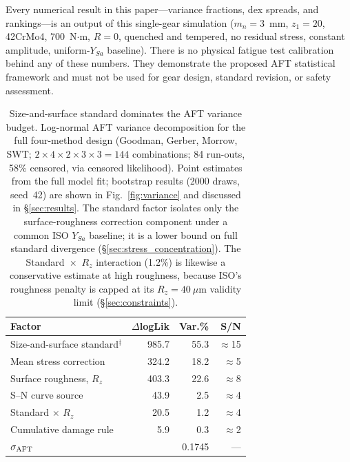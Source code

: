 \documentclass[twocolumn,12pt,a4paper]{article}
\begin{document}
\begin{warningbox}
Every numerical result in this paper---variance fractions, dex spreads,
and rankings---is an output of this single-gear simulation ($m_n=3$~mm,
$z_1=20$, 42CrMo4, 700~N$\cdot$m, $R=0$, quenched and tempered, no
residual stress, constant amplitude, uniform-$Y_{Sa}$ baseline). There
is no physical fatigue test calibration behind any of these numbers.
They demonstrate the proposed AFT statistical framework and must not be
used for gear design, standard revision, or safety assessment.
\end{warningbox}

\begin{table}[h]
\centering
\caption{Size-and-surface standard dominates the AFT variance budget.
Log-normal AFT variance decomposition for the full four-method design
(Goodman, Gerber, Morrow, SWT;
$2\times4\times2\times3\times3 = 144$ combinations; 84 run-outs,
58\% censored, via censored likelihood). Point estimates from the
full model fit; bootstrap results (2000 draws, seed~42) are shown
in Fig.~\ref{fig:variance} and discussed in \S\ref{sec:results}.
The standard factor isolates only the surface-roughness correction
component under a common ISO $Y_{Sa}$ baseline; it is a lower bound
on full standard divergence (\S\ref{sec:stress_concentration}). The
Standard~$\times$~$R_z$ interaction (1.2\%) is likewise a conservative
estimate at high roughness, because ISO's roughness penalty is capped
at its $R_z=40~\mu$m validity limit
(\S\ref{sec:constraints}).}
\label{tab:anova}
\footnotesize
\begin{tabular}{lrrr}
\toprule
Factor & $\Delta$logLik & Var.\% & S/N \\
\midrule
Size-and-surface standard$^\ddagger$ & 985.7 & 55.3 & $\approx$15 \\ %
Mean stress correction & 324.2 & 18.2 & $\approx$5 \\ %
Surface roughness, $R_z$    & 403.3 & 22.6 & $\approx$8 \\ %
S--N curve source      & 43.9 &  2.5 &  $\approx$4 \\ %
Standard $\times$ $R_z$     & 20.5 &  1.2 &  $\approx$4 \\ %
Cumulative damage rule &  5.9 &  0.3 &  $\approx$2 \\ %
\midrule
$\sigma_{\rm AFT}$          &        & 0.1745 & --- \\
\bottomrule
\end{tabular}


\end{table}
\end{document}
